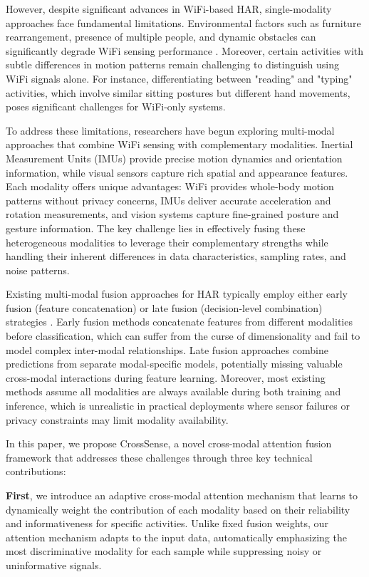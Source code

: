\documentclass[10pt,twocolumn]{article}
\begin{document}
However, despite significant advances in WiFi-based HAR, single-modality approaches face fundamental limitations. Environmental factors such as furniture rearrangement, presence of multiple people, and dynamic obstacles can significantly degrade WiFi sensing performance \cite{zhang2021environmental}. Moreover, certain activities with subtle differences in motion patterns remain challenging to distinguish using WiFi signals alone. For instance, differentiating between "reading" and "typing" activities, which involve similar sitting postures but different hand movements, poses significant challenges for WiFi-only systems.

To address these limitations, researchers have begun exploring multi-modal approaches that combine WiFi sensing with complementary modalities. Inertial Measurement Units (IMUs) provide precise motion dynamics and orientation information, while visual sensors capture rich spatial and appearance features. Each modality offers unique advantages: WiFi provides whole-body motion patterns without privacy concerns, IMUs deliver accurate acceleration and rotation measurements, and vision systems capture fine-grained posture and gesture information. The key challenge lies in effectively fusing these heterogeneous modalities to leverage their complementary strengths while handling their inherent differences in data characteristics, sampling rates, and noise patterns.

Existing multi-modal fusion approaches for HAR typically employ either early fusion (feature concatenation) or late fusion (decision-level combination) strategies \cite{chen2022fusion}. Early fusion methods concatenate features from different modalities before classification, which can suffer from the curse of dimensionality and fail to model complex inter-modal relationships. Late fusion approaches combine predictions from separate modal-specific models, potentially missing valuable cross-modal interactions during feature learning. Moreover, most existing methods assume all modalities are always available during both training and inference, which is unrealistic in practical deployments where sensor failures or privacy constraints may limit modality availability.

In this paper, we propose CrossSense, a novel cross-modal attention fusion framework that addresses these challenges through three key technical contributions:

\textbf{First}, we introduce an adaptive cross-modal attention mechanism that learns to dynamically weight the contribution of each modality based on their reliability and informativeness for specific activities. Unlike fixed fusion weights, our attention mechanism adapts to the input data, automatically emphasizing the most discriminative modality for each sample while suppressing noisy or uninformative signals.
\end{document}
